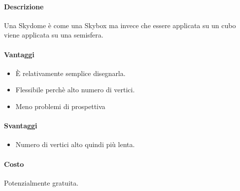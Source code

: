 \documentclass[8pt]{extarticle}
\begin{document}
\begin{multicols}{3}
\paragraph{Descrizione} 
Una Skydome è come una Skybox ma invece che essere applicata su un cubo viene applicata
su una semisfera.
\paragraph{Vantaggi}
\begin{itemize}
    \item È relativamente semplice disegnarla.
    \item Flessibile perchè alto numero di vertici.
    \item Meno problemi di prospettiva 
\end{itemize}
\paragraph{Svantaggi}
\begin{itemize}
    \item Numero di vertici alto quindi più lenta.
\end{itemize}
\paragraph{Costo} Potenzialmente gratuita.








\end{multicols}
\end{document}
